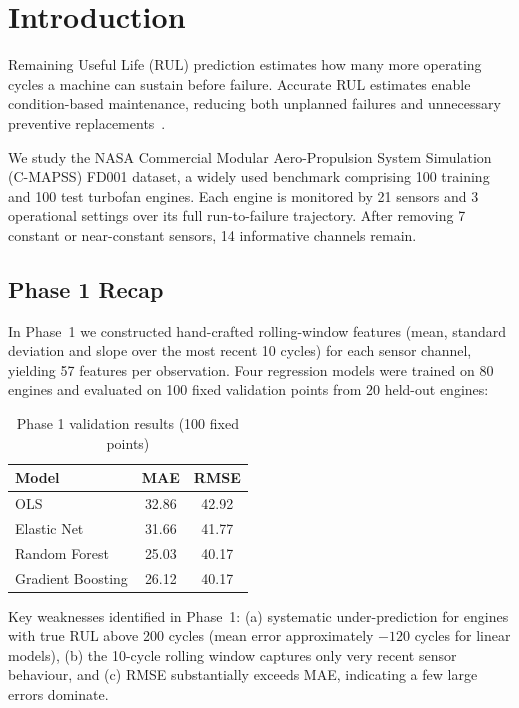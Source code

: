 \section{Introduction}
\label{sec:introduction}

Remaining Useful Life (RUL) prediction estimates how many more operating
cycles a machine can sustain before failure.  Accurate RUL estimates
enable condition-based maintenance, reducing both unplanned failures and
unnecessary preventive replacements~\cite{saxena_2008_damage_prognosis}.

We study the NASA Commercial Modular Aero-Propulsion System Simulation
(C-MAPSS) FD001 dataset, a widely used benchmark comprising 100 training
and 100 test turbofan engines.  Each engine is monitored by 21 sensors
and 3 operational settings over its full run-to-failure trajectory.
After removing 7 constant or near-constant sensors, 14 informative
channels remain.

\subsection{Phase 1 Recap}
In Phase~1 we constructed hand-crafted rolling-window features (mean,
standard deviation and slope over the most recent 10 cycles) for each
sensor channel, yielding 57 features per observation.  Four regression
models were trained on 80 engines and evaluated on 100 fixed validation
points from 20 held-out engines:

\begin{table}[h]
\centering
\caption{Phase 1 validation results (100 fixed points)}
\label{tab:phase1_results}
\begin{tabular}{lcc}
\toprule
Model & MAE & RMSE \\
\midrule
OLS & 32.86 & 42.92 \\
Elastic Net & 31.66 & 41.77 \\
Random Forest & 25.03 & 40.17 \\
Gradient Boosting & 26.12 & 40.17 \\
\bottomrule
\end{tabular}
\end{table}

Key weaknesses identified in Phase~1: (a) systematic under-prediction
for engines with true RUL above 200 cycles (mean error approximately
$-120$ cycles for linear models), (b) the 10-cycle rolling window
captures only very recent sensor behaviour, and (c) RMSE substantially
exceeds MAE, indicating a few large errors dominate.

